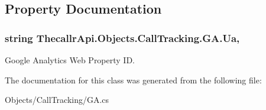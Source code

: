 \subsection{Property Documentation}
\hypertarget{class_thecallr_api_1_1_objects_1_1_call_tracking_1_1_g_a_a139a813922b509a8d633c8ff47f89578}{
\subsubsection[{Ua}]{\setlength{\rightskip}{0pt plus 5cm}string Thecallr\+Api.\+Objects.\+Call\+Tracking.\+G\+A.\+Ua\hspace{0.3cm}{\ttfamily [get]}, {\ttfamily [set]}}}\label{class_thecallr_api_1_1_objects_1_1_call_tracking_1_1_g_a_a139a813922b509a8d633c8ff47f89578}


Google Analytics Web Property I\+D. 



The documentation for this class was generated from the following file\+:\begin{DoxyCompactItemize}
\item 
Objects/\+Call\+Tracking/G\+A.\+cs\end{DoxyCompactItemize}
